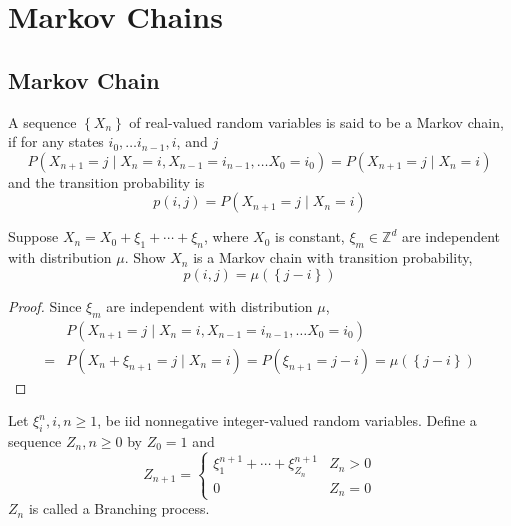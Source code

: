 \chapter{Markov Chains}

\section{Markov Chain}

\begin{definition}
	A sequence $\left\{X_{n}\right\}$ of real-valued random variables  is said to be a Markov chain, if for any states $i_{0},\ldots i_{n-1},i$, and $j$
	\begin{equation}
		P\left(X_{n+1}=j\mid X_{n}=i,X_{n-1}=i_{n-1},\ldots X_{0}=i_{0}\right)=P\left(X_{n+1}=j\mid X_{n}=i\right)
	\end{equation}
	and the transition probability is
	\begin{equation}
		p(i,j)=P\left(X_{n+1}=j\mid X_{n}=i\right)
	\end{equation}
\end{definition}

\begin{example}
	Suppose $X_{n}=X_{0}+\xi_{1}+\cdots+\xi_{n}$, where $X_{0}$ is constant, $\xi_{m}\in\mathbb{Z}^{d}$ are independent with distribution $\mu$. Show $X_{n}$ is a Markov chain with transition probability,
	\begin{equation*}
		p\left(i,j\right)=\mu\left(\left\{j-i\right\}\right)
	\end{equation*}
\end{example}

\begin{proof}
	Since $\xi_{m}$ are independent with distribution $\mu$,
	\begin{equation*}
		\begin{aligned}
			  & P\left(X_{n+1}=j\mid X_{n}=i,X_{n-1}=i_{n-1},\ldots X_{0}=i_{0}\right)                                     \\
			= & P\left(X_{n}+\xi_{n+1}=j\mid X_{n}=i\right)=P\left(\xi_{n+1}=j-i\right)=\mu\left(\left\{j-i\right\}\right)
		\end{aligned}
	\end{equation*}
\end{proof}

\begin{definition}
	Let $\xi_{i}^{n},i,n\geq 1$, be iid nonnegative integer-valued random variables. Define a sequence $Z_{n},n\geq 0$ by $Z_{0}=1$ and
	\begin{equation}
		Z_{n+1}=\left\{\begin{array}{ll}
			\xi_{1}^{n+1}+\cdots+\xi_{Z_{n}}^{n+1} & Z_{n}>0 \\
			0                                      & Z_{n}=0
		\end{array}\right.
	\end{equation}
	$Z_{n}$ is called a Branching process.
\end{definition}

